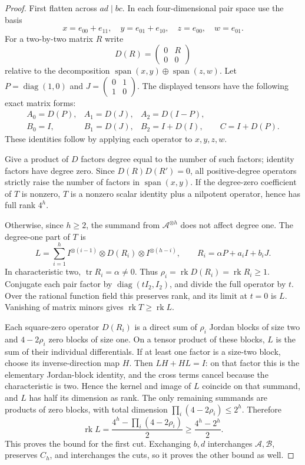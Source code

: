\begin{proof}
First flatten across $ad\mid bc$. In each four-dimensional pair
space use the basis
\[
 x=e_{00}+e_{11},\quad y=e_{01}+e_{10},\quad
 z=e_{00},\quad w=e_{01}.
\]
For a two-by-two matrix $R$ write
\[
 D(R)=\begin{pmatrix}0&R\\0&0\end{pmatrix}
\]
relative to the decomposition
$\operatorname{span}(x,y)\oplus\operatorname{span}(z,w)$.
Let $P=\operatorname{diag}(1,0)$ and
$J=\left(\begin{smallmatrix}0&1\\1&0\end{smallmatrix}\right)$.
The displayed tensors have the following exact matrix forms:
\[
 \begin{array}{lll}
 A_0=D(P),&A_1=D(J),&A_2=D(I-P),\\
 B_0=I,&B_1=D(J),&B_2=I+D(I),\qquad C=I+D(P).
 \end{array}
\]
These identities follow by applying each operator to $x,y,z,w$.

Give a product of $D$ factors degree equal to the number of such
factors; identity factors have degree zero. Since $D(R)D(R')=0$,
all positive-degree operators strictly raise the number of factors
in $\operatorname{span}(x,y)$. If the degree-zero coefficient of
$T$ is nonzero, $T$ is a nonzero scalar identity plus a nilpotent
operator, hence has full rank $4^h$.

Otherwise, since $h\ge2$, the summand from $\mathcal A^{\otimes h}$
does not affect degree one. The degree-one part of $T$ is
\[
 L=\sum_{i=1}^h I^{\otimes(i-1)}\otimes D(R_i)
                       \otimes I^{\otimes(h-i)},\qquad
 R_i=\alpha P+a_iI+b_iJ.
\]
In characteristic two, $\operatorname{tr}R_i=\alpha\ne0$.
Thus $\rho_i=\operatorname{rk}D(R_i)=\operatorname{rk}R_i\ge1$.
Conjugate each pair factor by
$\operatorname{diag}(tI_2,I_2)$, and divide the full operator by $t$.
Over the rational function field this preserves rank, and its limit
at $t=0$ is $L$. Vanishing of matrix minors gives
$\operatorname{rk}T\ge\operatorname{rk}L$.

Each square-zero operator $D(R_i)$ is a direct sum of $\rho_i$
Jordan blocks of size two and $4-2\rho_i$ zero blocks of size one.
On a tensor product of these blocks, $L$ is the sum of their
individual differentials. If at least one factor is a size-two
block, choose its inverse-direction map $H$. Then
$LH+HL=I$: on that factor this is the elementary Jordan-block
identity, and the cross terms cancel because the characteristic
is two. Hence the kernel and image of $L$ coincide on that summand,
and $L$ has half its dimension as rank. The only remaining summands
are products of zero blocks, with total dimension
$\prod_i(4-2\rho_i)\le2^h$. Therefore
\[
 \operatorname{rk}L=
 \frac{4^h-\prod_i(4-2\rho_i)}2
 \ge\frac{4^h-2^h}2.
\]
This proves the bound for the first cut. Exchanging $b,d$ interchanges
$\mathcal A,\mathcal B$, preserves $C_h$, and interchanges the cuts,
so it proves the other bound as well.


\end{proof}
